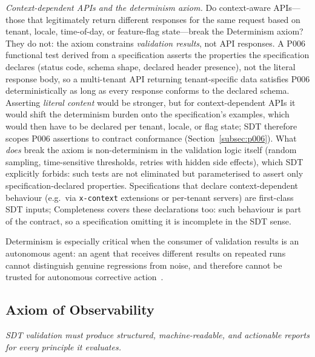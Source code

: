 \textit{Context-dependent APIs and the determinism axiom.} Do context-aware APIs---those that legitimately return different responses for the same request based on tenant, locale, time-of-day, or feature-flag state---break the Determinism axiom? They do not: the axiom constrains \emph{validation results}, not API responses. A P006 functional test derived from a specification asserts the properties the specification declares (status code, schema shape, declared header presence), not the literal response body, so a multi-tenant API returning tenant-specific data satisfies P006 deterministically as long as every response conforms to the declared schema. Asserting \emph{literal content} would be stronger, but for context-dependent APIs it would shift the determinism burden onto the specification's examples, which would then have to be declared per tenant, locale, or flag state; SDT therefore scopes P006 assertions to contract conformance (Section~\ref{subsec:p006}). What \emph{does} break the axiom is non-determinism in the validation logic itself (random sampling, time-sensitive thresholds, retries with hidden side effects), which SDT explicitly forbids: such tests are not eliminated but parameterised to assert only specification-declared properties. Specifications that declare context-dependent behaviour (e.g.\ via \texttt{x-context} extensions or per-tenant servers) are first-class SDT inputs; Completeness covers these declarations too: such behaviour is part of the contract, so a specification omitting it is incomplete in the SDT sense.

Determinism is especially critical when the consumer of validation results is an autonomous agent: an agent that receives different results on repeated runs cannot distinguish genuine regressions from noise, and therefore cannot be trusted for autonomous corrective action~\cite{swe-agent}.

\subsection{Axiom of Observability}
\label{subsec:axiom-observability}

\textit{SDT validation must produce structured, machine-readable, and actionable reports for every principle it evaluates.}

